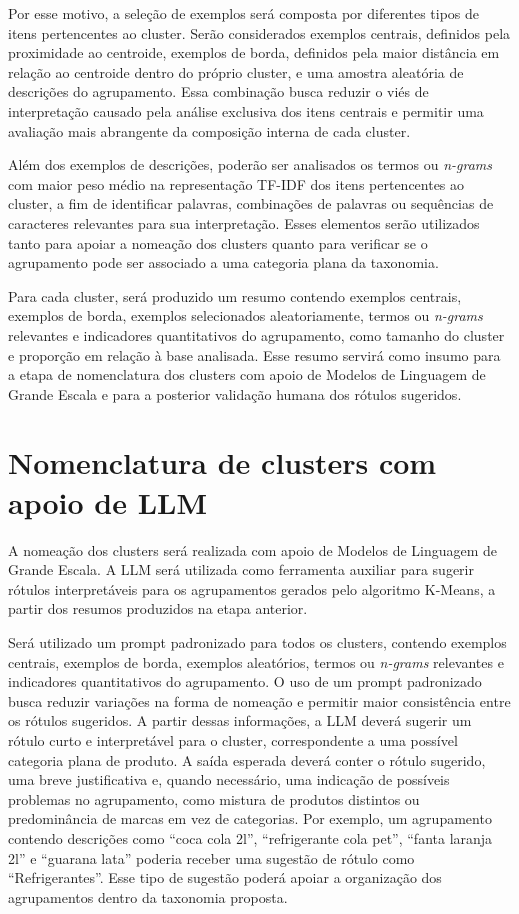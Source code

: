 \documentclass[english,brazilian]{UNISINOSmonografia}
\begin{document}
Por esse motivo, a seleção de exemplos será composta por diferentes tipos de itens pertencentes ao cluster. Serão considerados exemplos centrais, definidos pela proximidade ao centroide, exemplos de borda, definidos pela maior distância em relação ao centroide dentro do próprio cluster, e uma amostra aleatória de descrições do agrupamento. Essa combinação busca reduzir o viés de interpretação causado pela análise exclusiva dos itens centrais e permitir uma avaliação mais abrangente da composição interna de cada cluster.

Além dos exemplos de descrições, poderão ser analisados os termos ou \textit{n-grams} com maior peso médio na representação TF-IDF dos itens pertencentes ao cluster, a fim de identificar palavras, combinações de palavras ou sequências de caracteres relevantes para sua interpretação. Esses elementos serão utilizados tanto para apoiar a nomeação dos clusters quanto para verificar se o agrupamento pode ser associado a uma categoria plana da taxonomia.

Para cada cluster, será produzido um resumo contendo exemplos centrais, exemplos de borda, exemplos selecionados aleatoriamente, termos ou \textit{n-grams} relevantes e indicadores quantitativos do agrupamento, como tamanho do cluster e proporção em relação à base analisada. Esse resumo servirá como insumo para a etapa de nomenclatura dos clusters com apoio de Modelos de Linguagem de Grande Escala e para a posterior validação humana dos rótulos sugeridos.



\section{Nomenclatura de clusters com apoio de LLM}

A nomeação dos clusters será realizada com apoio de Modelos de Linguagem de Grande Escala. A LLM será utilizada como ferramenta auxiliar para sugerir rótulos interpretáveis para os agrupamentos gerados pelo algoritmo K-Means, a partir dos resumos produzidos na etapa anterior.

Será utilizado um prompt padronizado para todos os clusters, contendo exemplos centrais, exemplos de borda, exemplos aleatórios, termos ou \textit{n-grams} relevantes e indicadores quantitativos do agrupamento. O uso de um prompt padronizado busca reduzir variações na forma de nomeação e permitir maior consistência entre os rótulos sugeridos. A partir dessas informações, a LLM deverá sugerir um rótulo curto e interpretável para o cluster, correspondente a uma possível categoria plana de produto. A saída esperada deverá conter o rótulo sugerido, uma breve justificativa e, quando necessário, uma indicação de possíveis problemas no agrupamento, como mistura de produtos distintos ou predominância de marcas em vez de categorias. Por exemplo, um agrupamento contendo descrições como ``coca cola 2l'', ``refrigerante cola pet'', ``fanta laranja 2l'' e ``guarana lata'' poderia receber uma sugestão de rótulo como ``Refrigerantes''. Esse tipo de sugestão poderá apoiar a organização dos agrupamentos dentro da taxonomia proposta.
\end{document}
